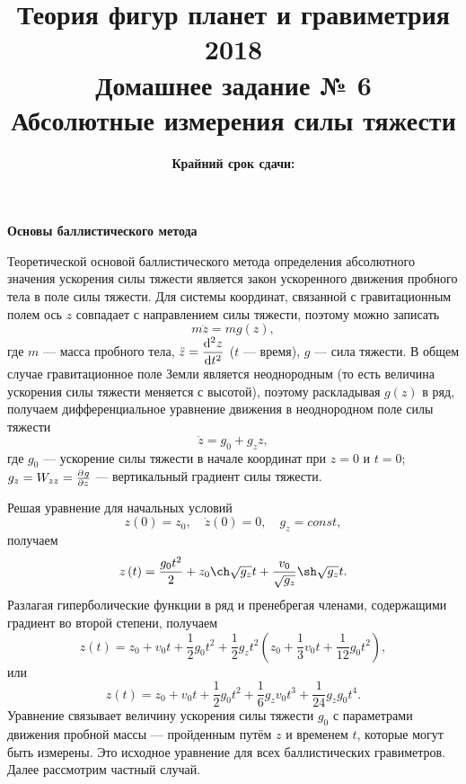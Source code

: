 \documentclass[12pt, a4paper]{article}
\title{{\Large Теория фигур планет и гравиметрия 2018}\\ 
    {\bf\Large Домашнее задание № 6} \\
    {\bf\Large Абсолютные измерения силы тяжести}
}
\author{}
\date{\normalsize\bf Крайний срок сдачи: \DTMusedate{deadline}}
\theoremstyle{remark}
\begin{document}
\maketitle
\thispagestyle{empty}
\begin{center}
    \textbf{Основы баллистического метода}
\end{center}

Теоретической основой баллистического метода определения абсолютного значения ускорения силы тяжести
является закон ускоренного движения пробного тела в поле силы тяжести. Для системы координат,
связанной с гравитационным полем ось $z$ совпадает с направлением силы тяжести, поэтому можно записать
\begin{equation*}
    m \ddot{z} = mg\left( z \right),
\end{equation*}
где $m$ --- масса пробного тела, $\ddot{z} = \dod[2]{z}{t}$ ($t$ --- время),
$g$ --- сила тяжести. 
В общем случае гравитационное поле Земли является неоднородным (то есть величина ускорения силы
тяжести меняется с высотой), поэтому раскладывая $g\left( z
\right)$ в ряд, получаем дифференциальное уравнение движения в неоднородном поле
силы тяжести
\begin{equation*}
    \ddot{z} = g_0 + g_z z,
\end{equation*}
где $g_0$ --- ускорение силы тяжести в начале координат при $z = 0$ и $t = 0$; $g_z = W_{zz} =
\pd{g}{z}$ --- вертикальный градиент силы тяжести.

Решая уравнение для начальных условий 
\begin{equation*}
    z\left( 0 \right) = z_0,\quad \dot{z}\left( 0 \right) = 0,\quad g_z = const, 
\end{equation*}
получаем
\begin{equation*}
    z\left( t \right) = \dfrac{g_0 t^2}{2} + z_0\ch\sqrt{g_z}t +
    \dfrac{v_0}{\sqrt{g_z}}\sh\sqrt{g_z}t.
\end{equation*}
Разлагая гиперболические функции в ряд и пренебрегая членами, содержащими градиент во второй
степени, получаем
\begin{equation*}
    z\left( t \right) = z_0 + v_0t + \dfrac{1}{2} g_0 t^2 + \dfrac{1}{2}g_zt^2\left( 
        z_0 + \dfrac{1}{3} v_0 t + \dfrac{1}{12} g_0 t^2
    \right),
\end{equation*}
или
\begin{equation}
    \label{eq:basic-freefall}
    z\left( t \right) = z_0 + v_0t + \dfrac{1}{2} g_0 t^2 + 
    \dfrac{1}{6}g_z v_0 t^3 +  
    \dfrac{1}{24}g_z g_0 t^4.
\end{equation}
Уравнение связывает величину ускорения силы тяжести $g_0$ с параметрами движения пробной массы ---
пройденным путём $z$ и временем $t$, которые могут быть измерены. Это исходное уравнение для всех
баллистических гравиметров. Далее рассмотрим частный случай.
\end{document}

